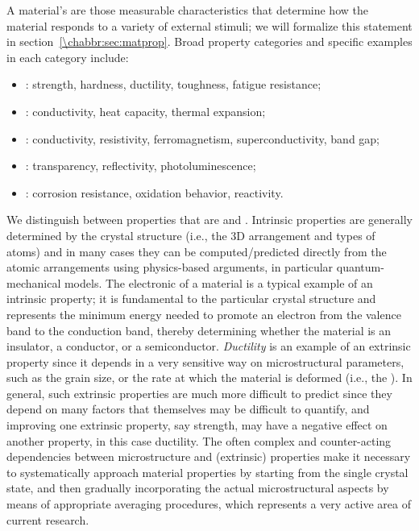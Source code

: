 A material's  are those measurable characteristics that determine how the material responds to a variety of external stimuli; we will formalize this statement in section~\ref{\chabbr:sec:matprop}. Broad property categories and specific examples in each category include:
\begin{itemize}
\item {}: strength, hardness, ductility, toughness, fatigue resistance;
\item {}: conductivity, heat capacity, thermal expansion;
\item {}: conductivity, resistivity, ferromagnetism, superconductivity, band gap;
\item {}: transparency, reflectivity, photoluminescence;
\item {}: corrosion resistance, oxidation behavior, reactivity.
\end{itemize}

We distinguish between properties that are  and . Intrinsic properties are generally determined by the crystal structure (i.e., the 3D arrangement and types of atoms) and in many cases they can be computed/predicted directly from the atomic arrangements using physics-based arguments, in particular quantum-mechanical models.  The electronic  of a material is  a typical example of an intrinsic property; it is fundamental to the particular crystal structure and represents the minimum energy needed to promote an electron from the valence band to the conduction band, thereby determining whether the material is an insulator, a conductor, or a semiconductor.  \textit{Ductility} is an example of an extrinsic property since it depends in a very sensitive way on microstructural parameters, such as the grain size, or the rate at which the material is deformed (i.e., the ).  In general, such extrinsic properties are much more difficult to predict since they depend on many factors that themselves may be difficult to quantify, and improving one extrinsic property, say strength, may have a negative effect on another property, in this case ductility.  The often complex and counter-acting dependencies between microstructure and (extrinsic) properties make it necessary to systematically approach material properties by starting from the single crystal state, and then gradually incorporating the actual microstructural aspects by means of appropriate averaging procedures, which represents a very active area of current research.


